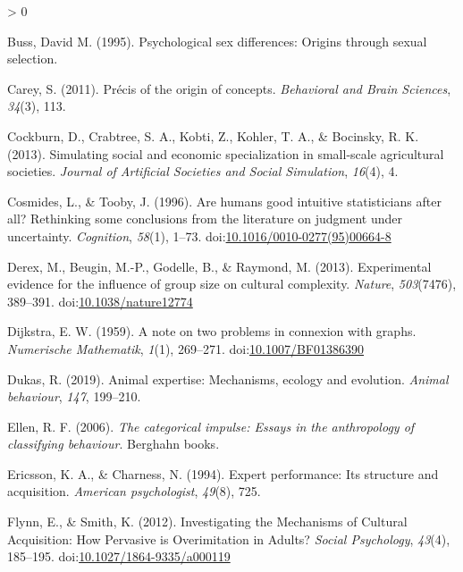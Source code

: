 \documentclass[
  11pt,
]{article}
\newlength{\cslhangindent}
\newenvironment{CSLReferences}[2] %
 {%
  \setlength{\parindent}{0pt}
  \ifodd #1 \everypar{\setlength{\hangindent}{\cslhangindent}}\ignorespaces\fi
  \ifnum #2 > 0
  \setlength{\parskip}{#2\baselineskip}
  \fi
 }%
 {}
\begin{document}
\begin{CSLReferences}{1}{0}
\leavevmode\hypertarget{ref-bussPsychologicalSexDifferences1995}{}%
Buss, David M. (1995). Psychological sex differences: {Origins} through sexual selection.

\leavevmode\hypertarget{ref-careyPrecisOriginConcepts2011}{}%
Carey, S. (2011). Précis of the origin of concepts. \emph{Behavioral and Brain Sciences}, \emph{34}(3), 113.

\leavevmode\hypertarget{ref-cockburn2013simulating}{}%
Cockburn, D., Crabtree, S. A., Kobti, Z., Kohler, T. A., \& Bocinsky, R. K. (2013). Simulating social and economic specialization in small-scale agricultural societies. \emph{Journal of Artificial Societies and Social Simulation}, \emph{16}(4), 4.

\leavevmode\hypertarget{ref-cosmidesAreHumansGood1996}{}%
Cosmides, L., \& Tooby, J. (1996). Are humans good intuitive statisticians after all? {Rethinking} some conclusions from the literature on judgment under uncertainty. \emph{Cognition}, \emph{58}(1), 1--73. doi:\href{https://doi.org/10.1016/0010-0277(95)00664-8}{10.1016/0010-0277(95)00664-8}

\leavevmode\hypertarget{ref-derexExperimentalEvidenceInfluence2013}{}%
Derex, M., Beugin, M.-P., Godelle, B., \& Raymond, M. (2013). Experimental evidence for the influence of group size on cultural complexity. \emph{Nature}, \emph{503}(7476), 389--391. doi:\href{https://doi.org/10.1038/nature12774}{10.1038/nature12774}

\leavevmode\hypertarget{ref-dijkstraNoteTwoProblems1959}{}%
Dijkstra, E. W. (1959). A note on two problems in connexion with graphs. \emph{Numerische Mathematik}, \emph{1}(1), 269--271. doi:\href{https://doi.org/10.1007/BF01386390}{10.1007/BF01386390}

\leavevmode\hypertarget{ref-dukasAnimalExpertiseMechanisms2019}{}%
Dukas, R. (2019). Animal expertise: Mechanisms, ecology and evolution. \emph{Animal behaviour}, \emph{147}, 199--210.

\leavevmode\hypertarget{ref-ellenCategoricalImpulseEssays2006}{}%
Ellen, R. F. (2006). \emph{The categorical impulse: Essays in the anthropology of classifying behaviour}. {Berghahn books}.

\leavevmode\hypertarget{ref-ericssonExpertPerformanceIts1994}{}%
Ericsson, K. A., \& Charness, N. (1994). Expert performance: {Its} structure and acquisition. \emph{American psychologist}, \emph{49}(8), 725.

\leavevmode\hypertarget{ref-flynnInvestigatingMechanismsCultural2012}{}%
Flynn, E., \& Smith, K. (2012). Investigating the {Mechanisms} of {Cultural Acquisition}: {How Pervasive} is {Overimitation} in {Adults}? \emph{Social Psychology}, \emph{43}(4), 185--195. doi:\href{https://doi.org/10.1027/1864-9335/a000119}{10.1027/1864-9335/a000119}


\end{CSLReferences}
\end{document}

